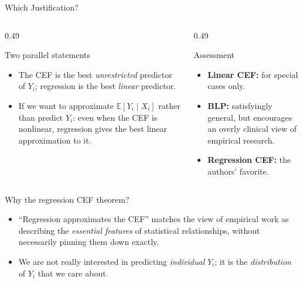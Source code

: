 \documentclass[aspectratio=169,11pt]{beamer}
\newcommand{\E}{\mathbb{E}}
\begin{document}
\begin{frame}{Which Justification?}
\small

\begin{columns}[T]
\begin{column}{0.49\textwidth}
\begin{block}{Two parallel statements}
\begin{itemize}
    \item The CEF is the best \emph{unrestricted} predictor of $Y_i$;
    regression is the best \emph{linear} predictor.
    \item If we want to approximate $\E[Y_i\mid X_i]$ rather than predict
    $Y_i$: even when the CEF is nonlinear, regression gives the best linear
    approximation to it.
\end{itemize}
\end{block}
\end{column}
\begin{column}{0.49\textwidth}
\begin{block}{Assessment}
\begin{itemize}
    \item \textbf{Linear CEF:} for special cases only.
    \item \textbf{BLP:} satisfyingly general, but encourages an overly
    clinical view of empirical research.
    \item \textbf{Regression CEF:} the authors' favorite.
\end{itemize}
\end{block}
\end{column}
\end{columns}

\bigskip

\begin{alertblock}{Why the regression CEF theorem?}
\begin{itemize}
    \item ``Regression approximates the CEF'' matches the view of empirical
    work as describing the \emph{essential features} of statistical
    relationships, without necessarily pinning them down exactly.
    \item We are not really interested in predicting \emph{individual}
    $Y_i$; it is the \emph{distribution} of $Y_i$ that we care about.
\end{itemize}
\end{alertblock}

\end{frame}
\end{document}
